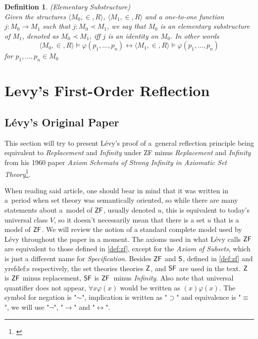 \documentclass[12pt,a4paper]{article}
\newtheorem{definition}[theorem]{Definition}
\renewcommand{\iff}{\leftrightarrow}
\newcommand{\then}{\rightarrow}
\begin{document}
\begin{definition}{(Elementary Substructure)}\label{def:elementary_substructure}\\
Given the structures $\langle M_0, \in, R \rangle$, $\langle M_1, \in, R \rangle$ and a one-to-one function $j: M_0 \then M_1$ such that $j: M_0 \prec M_1$, we say that $M_0$ is an \emph{elementary substructure} of $M_1$, denoted as $M_0 \prec M_1$, iff $j$ is an identity on $M_0$. In other words
\begin{equation}
\langle M_0, \in, R \rangle \models \varphi(p_1, \ldots, p_n) \iff \langle M_1, \in, R \rangle  \models \varphi(p_1, \ldots, p_n)
\end{equation}
for $p_1, \ldots, p_n \in M_0$
\end{definition}


\newpage
\section{Levy's First-Order Reflection}\label{sec:first_order}

\subsection{Lévy's Original Paper}\label{sec:levy1960}
This section will try to present Lévy's proof of a~general reflection principle being equivalent to \emph{Replacement} and \emph{Infinity} under ZF minus \emph{Replacement} and \emph{Infinity} from his 1960 paper \emph{Axiom Schemata of Strong Infinity in Axiomatic Set Theory}\footnote{\cite{Levy60a}}.

When reading said article, one should bear in mind that it was written in a~period when set theory was semantically oriented, so while there are many statements about a~model of $\sf{ZF}$, usually denoted $u$, this is equivalent to today's universal class $V$, so it doesn't necessarily mean that there is a set $u$ that is a model of $\sf{ZF}$. We will review the notion of a standard complete model used by Lévy throughout the paper in a moment.
The axioms used in what Lévy calls $\sf{ZF}$ are equivalent to those defined in \ref{def:zf}, except for the \emph{Axiom of Subsets}, which is just a different name for \emph{Specification}.
Besides $\sf{ZF}$ and $\sf{S}$, defined in \ref{def:zf} and yref{def:s} respectively, the set theories theories $\sf{Z}$, and $\sf{SF}$ are used in the text. $\sf{Z}$ is $\sf{ZF}$ minus replacement, $\sf{SF}$ is $\sf{ZF}$ minus \emph{Infinity}. Also note that universal quantifier does not appear, $\forall x \varphi (x)$ would be written as $(x) \varphi (x)$. The symbol for negation is "$\sim$", implication is written as "$\supset$" and equivalence is "$\equiv$", we will use "$\neg$", "$\then$" and "$\iff$".
\end{document}
